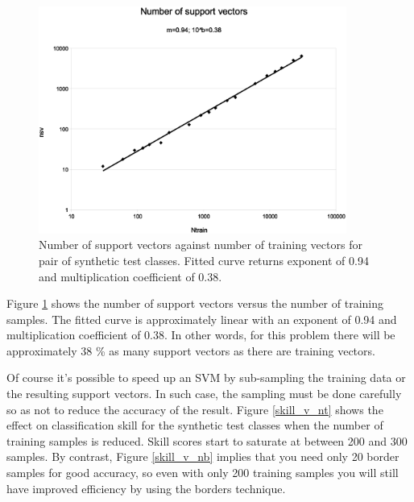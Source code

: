 \begin{figure}
\includegraphics[width=0.9\textwidth]{nsv}
\caption{Number of support vectors against number of training vectors for pair of synthetic test classes. Fitted curve returns exponent of 0.94 and multiplication coefficient of 0.38.}
\label{nsv}
\end{figure}

Figure \ref{nsv} shows the number of support vectors versus the
number of training samples. The fitted curve is approximately linear 
with an exponent of 0.94 and multiplication coefficient of 0.38.
In other words, for this problem there will be approximately 38 \% as many 
support vectors as there are training vectors.

Of course it's possible to speed up an SVM by sub-sampling the training data
or the resulting support vectors.
In such case, the sampling must be done carefully so as not to reduce the
accuracy of the result.
Figure \ref{skill_v_nt} shows the effect on classification skill for the
synthetic test classes when the number of training samples is reduced.
Skill scores start to saturate at between 200 and 300 samples.
By contrast, Figure \ref{skill_v_nb} implies that you need only 20 border samples
for good accuracy, so even with only 200 training samples you will still
have improved efficiency by using the borders technique.

